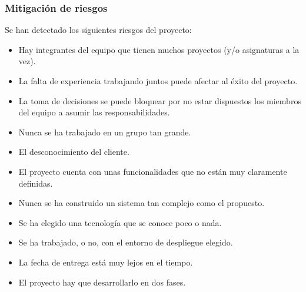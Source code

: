 \documentclass[11pt]{article}
\begin{document}
\subsubsection{Mitigación de riesgos}
Se han detectado los siguientes riesgos del proyecto:
\begin{itemize}
		\item[Ri1] Hay integrantes del equipo que tienen muchos proyectos (y/o asignaturas a la vez).
		\item[Ri2] La falta de experiencia trabajando juntos puede afectar al éxito del proyecto.
		\item[Ri3] La toma de decisiones se puede bloquear por no estar dispuestos los miembros del equipo a asumir las responsabilidades.
		\item[Ri4] Nunca se ha trabajado en un grupo tan grande.
		\item[Ri5] El desconocimiento del cliente.
		\item[Ri6] El proyecto cuenta con unas funcionalidades que no están muy claramente definidas.
		\item[Ri7] Nunca se ha construido un sistema tan complejo como el propuesto.
		\item[Ri8] Se ha elegido una tecnología que se conoce poco o nada.
		\item[Ri9] Se ha trabajado, o no, con el entorno de despliegue elegido.
		\item[Ri10]La fecha de entrega está muy lejos en el tiempo.
		\item[Ri11]El proyecto hay que desarrollarlo en dos fases.
\end{itemize}
\end{document}
